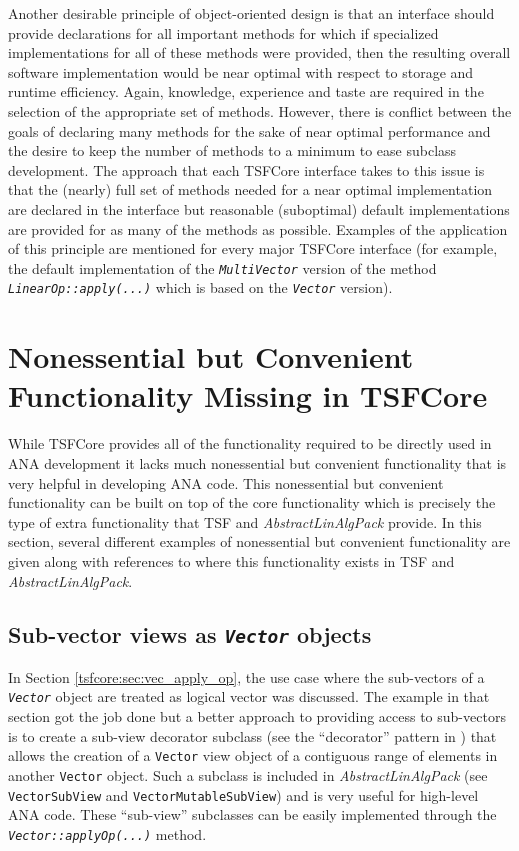 Another desirable principle of object-oriented design is that an
interface should provide declarations for all important methods for
which if specialized implementations for all of these methods were
provided, then the resulting overall software implementation would be
near optimal with respect to storage and runtime efficiency.  Again,
knowledge, experience and taste are required in the selection of the
appropriate set of methods.  However, there is conflict between the
goals of declaring many methods for the sake of near optimal
performance and the desire to keep the number of methods to a minimum
to ease subclass development.  The approach that each TSFCore
interface takes to this issue is that the (nearly) full set of methods
needed for a near optimal implementation are declared in the interface
but reasonable (suboptimal) default implementations are provided for
as many of the methods as possible.  Examples of the application of
this principle are mentioned for every major TSFCore interface (for
example, the default implementation of the
\texttt{\textit{Multi\-Vector}} version of the method
\texttt{\textit{LinearOp\-::apply(\-...)}} which is based on
the \texttt{\textit{Vector}} version).

%
\section{Nonessential but Convenient Functionality Missing in TSFCore}
\label{tsfcore:sec:convenience_functionality}
%

While TSFCore provides all of the functionality required to be
directly used in ANA development it lacks much nonessential but convenient
functionality that is very helpful in developing ANA code.  This
nonessential but convenient functionality can be built on top of the core
functionality which is precisely the type of extra functionality that
TSF and \textit{AbstractLinAlgPack} provide.  In this section, several
different examples of nonessential but convenient functionality are given along
with references to where this functionality exists in TSF and
\textit{AbstractLinAlgPack}.

%
\subsection{Sub-vector views as \texttt{\textit{Vector}} objects}
%

In Section \ref{tsfcore:sec:vec_apply_op}, the use case where the
sub-vectors of a \texttt{\textit{Vector}} object are treated as logical
vector was discussed.  The example in that section got the job done
but a better approach to providing access to sub-vectors is to create a
sub-view decorator subclass (see the ``decorator'' pattern in
\cite{ref:gama_et_al_1995}) that allows the creation of a
\texttt{Vector} view object of a contiguous range of elements in
another \texttt{Vector} object.  Such a subclass is included in
\textit{AbstractLinAlgPack} (see \texttt{VectorSubView} and
\texttt{Vector\-Mutable\-Sub\-View}) and is very useful for high-level ANA
code.  These ``sub-view'' subclasses can be easily implemented through the
\texttt{\textit{Vector\-::applyOp(\-...)}} method.

